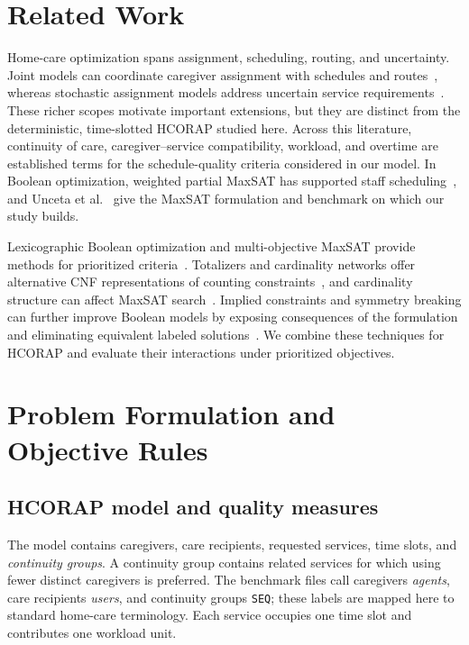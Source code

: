 \documentclass[sigconf,nonacm]{acmart}
\begin{document}
\section{Related Work}
\label{sec:related-work}

Home-care optimization spans assignment, scheduling, routing, and uncertainty.
Joint models can coordinate caregiver assignment with schedules and
routes~\cite{CappaneraScutella2015}, whereas stochastic assignment models address
uncertain service requirements~\cite{ErrarhoutEtAl2016}.  These richer scopes
motivate important extensions, but they are distinct from the deterministic,
time-slotted HCORAP studied here.  Across this literature, continuity of care,
caregiver--service compatibility, workload, and overtime are established terms
for the schedule-quality criteria considered in our model.  In Boolean
optimization, weighted partial MaxSAT has supported staff
scheduling~\cite{DemirovicEtAl2019}, and Unceta et al.~\cite{UncetaEtAl2024}
give the MaxSAT formulation and benchmark on which our study builds.

Lexicographic Boolean optimization and multi-objective MaxSAT provide methods
for prioritized criteria~\cite{MarquesSilvaEtAl2011,JabsEtAl2024}.  Totalizers
and cardinality networks offer alternative CNF representations of counting
constraints~\cite{BailleuxBoufkhad2003,BailleuxBoufkhad2004,AsinEtAl2011}, and
cardinality structure can affect MaxSAT search~\cite{MorgadoEtAl2014,JahrenAsin2018}.
Implied constraints and symmetry breaking can further improve Boolean models by
exposing consequences of the formulation and eliminating equivalent labeled
solutions~\cite{BofillEtAl2022,BogaertsEtAl2022}.  We combine these techniques
for HCORAP and evaluate their interactions under prioritized objectives.

\section{Problem Formulation and Objective Rules}
\label{sec:problem}

\subsection{HCORAP model and quality measures}

The model contains caregivers, care recipients, requested services, time slots,
and \emph{continuity groups}.  A continuity group contains related services for
which using fewer distinct caregivers is preferred.  The benchmark files call
caregivers \emph{agents}, care recipients \emph{users}, and continuity groups
\texttt{SEQ}; these labels are mapped here to standard home-care terminology.
Each service occupies one time slot and contributes one workload unit.
\end{document}
